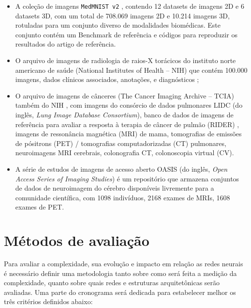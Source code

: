 \documentclass[
	12pt,				%
	openany,oneside,
	a4paper,			%
	english,			%
	brazil,				%
	]{abntex2}
\begin{document}
\begin{itemize}
\item A coleção de imagens \texttt{MedMNIST v2} \cite{Yang2021}, contendo 12 datasets de imagens 2D e 6 datasets 3D, com um total de 708.069 imagens 2D e 10.214 imagens 3D, rotuladas para um conjunto diverso de modalidades biomédicas. Este conjunto contém um Benchmark de referência e códigos para reproduzir os resultados do artigo de referência.

\item O arquivo de imagens de radiologia de raios-X torácicos do instituto norte americano de saúde (National Institutes of Health – NIH) que contém 100.000 imagens, dados clínicos associados, anotações, e diagnósticos \cite{c40}; 
\item O arquivo de imagens de cânceres (The Cancer Imaging Archive – TCIA) também do NIH \cite{c41}, com imagens do consórcio de dados pulmonares LIDC (do inglês, \textit{Lung Image Database Consortium}), banco de dados de imagens de referência para avaliar a resposta à terapia de câncer de pulmão (RIDER) \cite{c42}, imagens de ressonância magnética (MRI) de mama, tomografias de emissões de pósitrons (PET) / tomografias computadorizadas (CT) pulmonares, neuroimagens MRI cerebrais, colonografia CT, colonoscopia virtual (CV).
\item A série de estudos de imagens de acesso aberto OASIS (do inglês, \textit{Open Access Series of Imaging Studies}) \cite{c43} é um repositório que armazena conjuntos de dados de neuroimagem do cérebro disponíveis livremente para a comunidade científica, com 1098 indivíduos, 2168 exames de MRIs, 1608 exames de PET. 
\end{itemize}

\section{Métodos de avaliação}
\label{sec:metodos}

Para avaliar a complexidade, sua evolução e impacto em relação as redes neurais é necessário definir uma metodologia tanto sobre como será feita a medição da complexidade, quanto sobre quais redes e estruturas arquitetônicas serão avaliadas. Uma parte do cronograma será dedicada para estabelecer melhor os três critérios definidos abaixo:
\end{document}
